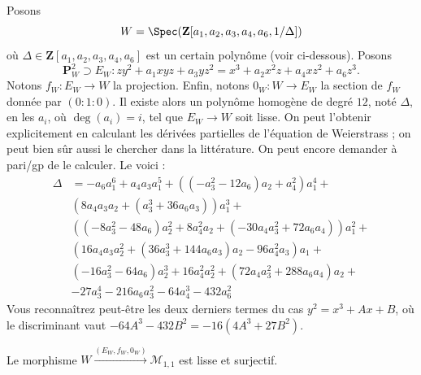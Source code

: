 \medskip\noindent
Posons
$$
W = \Spec(\mathbf{Z}[a_1, a_2, a_3, a_4, a_6, 1/\Delta])
$$
où $\Delta \in \mathbf{Z}[a_1, a_2, a_3, a_4, a_6]$ est un certain polynôme
(voir ci-dessous). Posons
$$
\mathbf{P}_W^2 \supset E_W :
zy^2 + a_1 xyz + a_3 yz^2 = x^3 + a_2x^2z + a_4xz^2 + a_6z^3.
$$
Notons $f_W : E_W \to W$ la projection. Enfin, notons $0_W : W \to E_W$ la
section de $f_W$ donnée par $(0 : 1 : 0)$. Il existe alors un polynôme homogène
de degré $12$, noté $\Delta$, en les $a_i$, où $\deg(a_i) = i$, tel que
$E_W \to W$ soit lisse. On peut l'obtenir explicitement en calculant les
dérivées partielles de l'équation de Weierstrass ; on peut bien sûr aussi le
chercher dans la littérature. On peut encore demander à pari/gp de le
calculer. Le voici :
\begin{align*}
\Delta & = -a_6a_1^6 + a_4a_3a_1^5 + ((-a_3^2 - 12a_6)a_2 + a_4^2)a_1^4 + \\
& (8a_4a_3a_2 + (a_3^3 + 36a_6a_3))a_1^3 + \\
& ((-8a_3^2 - 48a_6)a_2^2 + 8a_4^2a_2 + (-30a_4a_3^2 + 72a_6a_4))a_1^2 + \\
& (16a_4a_3a_2^2 + (36a_3^3 + 144a_6a_3)a_2 - 96a_4^2a_3)a_1 + \\
& (-16a_3^2 - 64a_6)a_2^3 + 16a_4^2a_2^2 + (72a_4a_3^2 + 288a_6a_4)a_2 + \\
& -27a_3^4 - 216a_6a_3^2  -64a_4^3 - 432a_6^2
\end{align*}
Vous reconnaîtrez peut-être les deux derniers termes du cas
$y^2 = x^3 + Ax + B$, où le discriminant vaut
$-64A^3 - 432B^2 = -16(4A^3 + 27B^2)$.

\begin{lemma}
\label{lemma-Weierstrass-smooth-cover}
Le morphisme $W \xrightarrow{(E_W, f_W, 0_W)} \mathcal{M}_{1, 1}$ est lisse
et surjectif.
\end{lemma}

